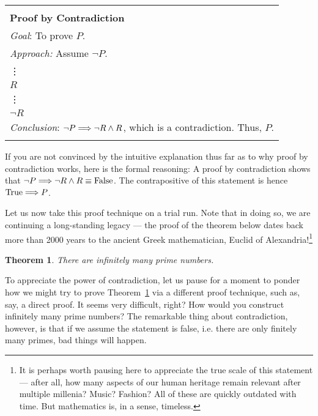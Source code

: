 \documentclass[11pt]{article}
\newcounter{thm}
\newtheorem{theorem}{Theorem}[thm]
\begin{document}
\begin{tabular}{|l|}
 \hline \\
        {\bf Proof by Contradiction}\\
        \hspace{.5cm}\emph{Goal}: To prove $P$. \\
        \hspace{.5cm}\emph{Approach:} Assume $\neg P$. \\
  \hspace{2.9cm} \vdots \\
  \hspace{2.9cm}$R$ \\
  \hspace{2.9cm} \vdots \\
  \hspace{2.7cm}$\neg R$ \\
  \hspace{.5cm}\emph{Conclusion}: $\neg P\Longrightarrow\neg R \wedge R$, which is a contradiction. Thus, $P$.\\\\
 \hline
\end{tabular}
\vspace{.2cm}

If you are not convinced by the intuitive explanation thus far as to why proof by contradiction works, here is the formal reasoning: A proof by contradiction shows that $\neg P\Longrightarrow \neg R\wedge R\equiv\text{False}$. The contrapositive of this statement is hence $\text{True}\Longrightarrow P$.

Let us now take this proof technique on a trial run. Note that in doing so, we are continuing a long-standing legacy --- the proof of the theorem below dates back more than 2000 years to the ancient Greek mathematician, Euclid of Alexandria!\footnote{It is perhaps worth pausing here to appreciate the true scale of this statement --- after all, how many aspects of our human heritage remain relevant after multiple millenia? Music? Fashion? All of these are quickly outdated with time. But mathematics is, in a sense, timeless.}

\begin{theorem}\label{thm:infiniteprimes}
    There are infinitely many prime numbers.
\end{theorem}

To appreciate the power of contradiction, let us pause for a moment to ponder how we might try to prove Theorem~\ref{thm:infiniteprimes} via a different proof technique, such as, say, a direct proof. It seems very difficult, right? How would you construct infinitely many prime numbers? The remarkable thing about contradiction, however, is that if we assume the statement is false, i.e. there are only finitely many primes, bad things will happen.
\end{document}

